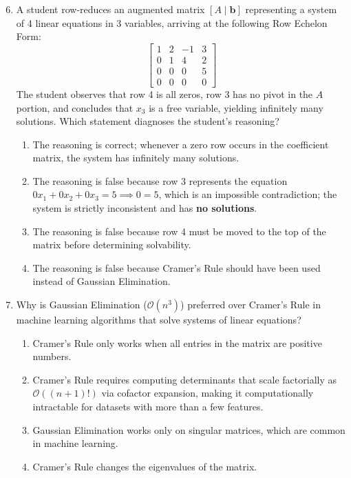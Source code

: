 \begin{enumerate}
    \setcounter{enumi}{5}
    \item A student row-reduces an augmented matrix $[A \mid \mathbf{b}]$ representing a system of 4 linear equations in 3 variables, arriving at the following Row Echelon Form:
    \begin{equation}
    \left[\begin{array}{ccc|c}
    1 & 2 & -1 & 3 \\
    0 & 1 & 4 & 2 \\
    0 & 0 & 0 & 5 \\
    0 & 0 & 0 & 0
    \end{array}\right]
    \end{equation}
    The student observes that row 4 is all zeros, row 3 has no pivot in the $A$ portion, and concludes that $x_3$ is a free variable, yielding infinitely many solutions. Which statement diagnoses the student's reasoning?
    \begin{enumerate}
        \item The reasoning is correct; whenever a zero row occurs in the coefficient matrix, the system has infinitely many solutions.
        \item The reasoning is false because row 3 represents the equation $0x_1 + 0x_2 + 0x_3 = 5 \implies 0 = 5$, which is an impossible contradiction; the system is strictly inconsistent and has \textbf{no solutions}.
        \item The reasoning is false because row 4 must be moved to the top of the matrix before determining solvability.
        \item The reasoning is false because Cramer's Rule should have been used instead of Gaussian Elimination.
    \end{enumerate}

    \item Why is Gaussian Elimination ($\mathcal{O}(n^3)$) preferred over Cramer's Rule in machine learning algorithms that solve systems of linear equations?
    \begin{enumerate}
        \item Cramer's Rule only works when all entries in the matrix are positive numbers.
        \item Cramer's Rule requires computing determinants that scale factorially as $\mathcal{O}((n+1)!)$ via cofactor expansion, making it computationally intractable for datasets with more than a few features.
        \item Gaussian Elimination works only on singular matrices, which are common in machine learning.
        \item Cramer's Rule changes the eigenvalues of the matrix.
    \end{enumerate}
\end{enumerate}

